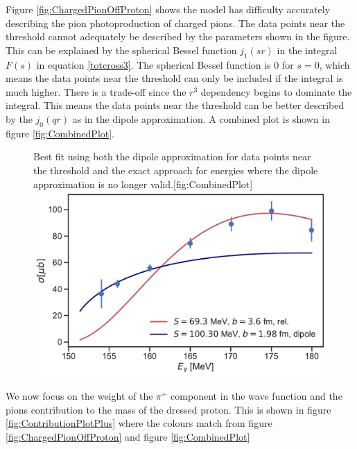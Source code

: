 Figure \ref{fig:ChargedPionOffProton} shows the model has difficulty accurately describing the pion photoproduction of charged pions. The data points near the threshold cannot adequately be described by the parameters shown in the figure. This can be explained by the spherical Bessel function $j_1(sr)$ in the integral $F(s)$ in equation \eqref{totcross3}. The spherical Bessel function is 0 for $s=0$, which means the data points near the threshold can only be included if the integral is much higher. There is a trade-off since the $r^3$ dependency begins to dominate the integral. This means the data points near the threshold can be better described by the $j_0(qr)$ as in the dipole approximation. A combined plot is shown in figure \ref{fig:CombinedPlot}. 
\begin{figure}[H]
	\begin{sidecaption}{Best fit using both the dipole approximation for data points near the threshold and the exact approach for energies where the dipole approximation is no longer valid.}[fig:CombinedPlot]
		\includegraphics[width=\linewidth]{Figures/ChargedPionOffProtonExact1.pdf}
	\end{sidecaption}
\end{figure}
We now focus on the weight of the $\pi^+$ component in the wave function and the pions contribution to the mass of the dressed proton. This is shown in figure \ref{fig:ContributionPlotPlus} where the colours match from figure \ref{fig:ChargedPionOffProton} and figure \ref{fig:CombinedPlot}
